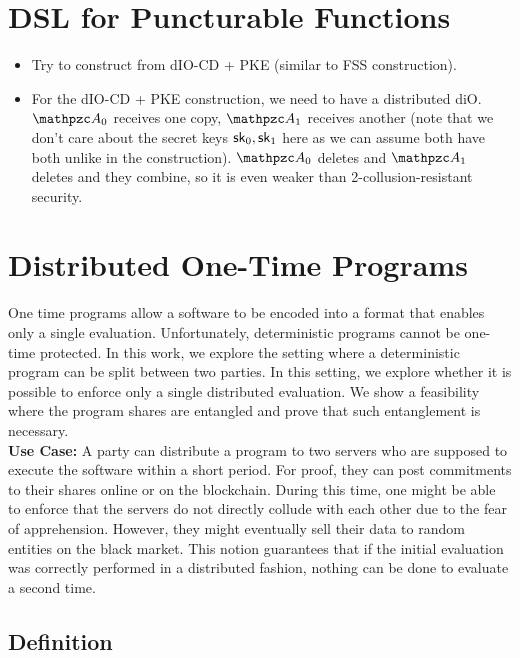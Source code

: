 \section{DSL for Puncturable Functions}

\begin{itemize}
\item Try to construct from dIO-CD + PKE (similar to FSS
construction).

\item For the dIO-CD + PKE construction, we need to have a distributed
diO. $\qA_0$ receives one copy, $\qA_1$ receives another (note that we
don't care about the secret keys $\mathsf{sk}_0, \mathsf{sk}_1$ here as we can assume
both have both unlike in the construction). $\qA_0$ deletes and
$\qA_1$ deletes and they combine, so it is even weaker than
2-collusion-resistant security.
\end{itemize}

\section{Distributed One-Time Programs}

One time programs allow a software to be encoded into a format that
enables only a single evaluation. Unfortunately, deterministic programs
cannot be one-time protected. In this work, we explore the setting
where a deterministic program can be split between two parties. In
this setting, we explore whether it is possible to enforce only a single
distributed evaluation. We show a feasibility where the program shares
are entangled and prove that such entanglement is necessary.\\

\noindent
\textbf{Use Case:} A party can
distribute a program to two servers who are supposed to execute the
software within a short period. For proof, they can post commitments
to their shares online or on the blockchain. During this time, one
might be able to enforce that the servers do not directly collude with
each other due to the fear of apprehension. However, they might
eventually sell their data to random entities on the black market.
This notion guarantees that if the initial evaluation was correctly performed
in a distributed fashion, nothing can be done to evaluate a second time.

\subsection{Definition}

